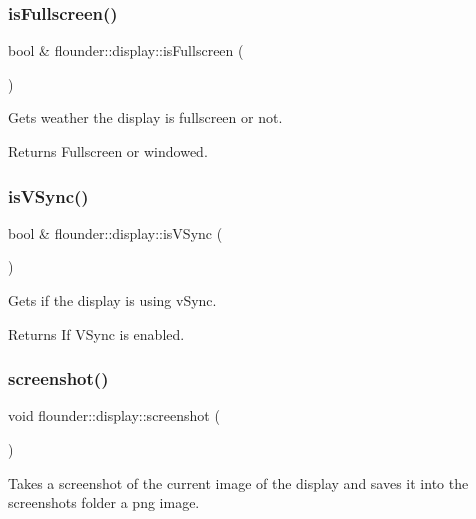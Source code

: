 \subsubsection{\texorpdfstring{is\+Fullscreen()}{isFullscreen()}}
{\footnotesize\ttfamily bool \& flounder\+::display\+::is\+Fullscreen (\begin{DoxyParamCaption}{ }\end{DoxyParamCaption})}



Gets weather the display is fullscreen or not. 

\begin{DoxyReturn}{Returns}
Fullscreen or windowed. 
\end{DoxyReturn}
\mbox{\label{classflounder_1_1display_a0cc7e0037aa9a45127de4db882c5a632}} 
\subsubsection{\texorpdfstring{is\+V\+Sync()}{isVSync()}}
{\footnotesize\ttfamily bool \& flounder\+::display\+::is\+V\+Sync (\begin{DoxyParamCaption}{ }\end{DoxyParamCaption})}



Gets if the display is using v\+Sync. 

\begin{DoxyReturn}{Returns}
If V\+Sync is enabled. 
\end{DoxyReturn}
\mbox{\label{classflounder_1_1display_af27b3f93977c32c79ad9522672e484c5}} 
\subsubsection{\texorpdfstring{screenshot()}{screenshot()}}
{\footnotesize\ttfamily void flounder\+::display\+::screenshot (\begin{DoxyParamCaption}{ }\end{DoxyParamCaption})}



Takes a screenshot of the current image of the display and saves it into the screenshots folder a png image. 

